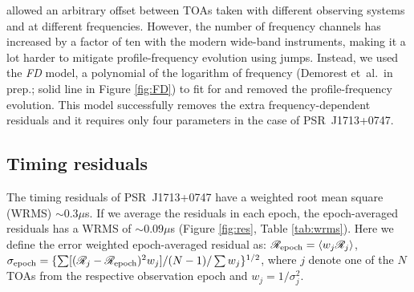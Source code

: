 \citet{sns+05} allowed an arbitrary offset between TOAs taken with different
observing systems and at different frequencies.
However, the number of frequency
channels has increased by a factor of ten with the modern wide-band
instruments, making it a lot harder to mitigate profile-frequency evolution using jumps. 
Instead, we used the {\it FD} model, a polynomial of the logarithm of
frequency (Demorest et~al.\ in prep.; solid line in Figure
\ref{fig:FD}) to fit for and removed the profile-frequency
evolution. This model successfully removes the extra
frequency-dependent residuals and it requires only four parameters in the
case of PSR~J1713+0747.



\subsection{Timing residuals}
\label{sec:res}

The timing residuals of PSR~J1713+0747 have a weighted root mean square (WRMS) $\sim 0.3\mu$s.
If we average the residuals in each epoch, the epoch-averaged residuals has a 
WRMS of $\sim 0.09\mu$s (Figure \ref{fig:res}, Table \ref{tab:wrms}).
Here we define the error weighted epoch-averaged residual as: 
$\mathscr{R}_{\rm epoch} = \langle w_j\mathscr{R}_{j}\rangle$, $\sigma_{\rm
epoch}=\{\sum [(\mathscr{R}_j-\mathscr{R}_{\rm epoch})^2w_j]/(N-1)/\sum w_j\}^{1/2}$, where $j$
denote one of the $N$ TOAs from the respective observation epoch and
$w_j=1/\sigma_j^2$.



